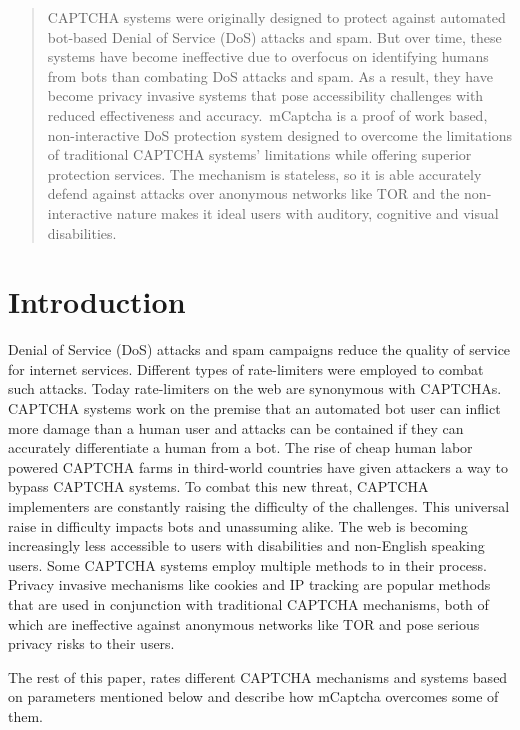 \begin{abstract}
	CAPTCHA systems were originally designed to protect against automated
	bot-based Denial of Service (DoS) attacks and spam. But over time, these
	systems have become ineffective due to overfocus on identifying humans from
	bots than combating DoS attacks and spam. As a result, they have become
	privacy invasive systems that pose accessibility challenges with reduced
	effectiveness and accuracy.\ mCaptcha is a proof of work based,
	non-interactive DoS protection system designed to overcome the limitations
	of traditional CAPTCHA systems' limitations while offering superior
	protection services. The mechanism is stateless, so it is able accurately
	defend against attacks over anonymous networks like TOR and the
	non-interactive nature makes it ideal users with auditory, cognitive and
	visual disabilities.
\end{abstract}
 
\section{Introduction}\label{sec:intro}
Denial of Service (DoS) attacks and spam campaigns reduce the quality of service
for internet services. Different types of rate-limiters were employed to combat
such attacks. Today rate-limiters on the web are synonymous with CAPTCHAs.
CAPTCHA systems work on the premise that an automated bot user can inflict more
damage than a human user and attacks can be contained if they can accurately
differentiate a human from a bot. The rise of cheap human labor powered CAPTCHA
farms in third-world countries have given attackers a way to bypass CAPTCHA
systems. To combat this new threat, CAPTCHA implementers are constantly raising the
difficulty of the challenges. This universal raise in difficulty impacts bots
and unassuming alike. The web is becoming increasingly less accessible to users
with disabilities and non-English speaking users. Some CAPTCHA systems employ
multiple methods to in their process. Privacy invasive mechanisms like cookies
and IP tracking are popular methods that are used in conjunction with
traditional CAPTCHA mechanisms, both of which are ineffective against
anonymous networks like TOR and pose serious privacy risks to their users.

The rest of this paper, rates different CAPTCHA mechanisms and systems based on
parameters mentioned below and describe how mCaptcha overcomes some of
them. 






